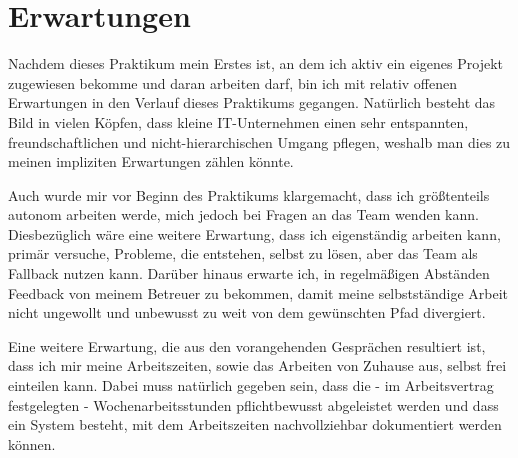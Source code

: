 
\section{Erwartungen}
\label{sec:erwartungen}

Nachdem dieses Praktikum mein Erstes ist, an dem ich aktiv ein eigenes Projekt zugewiesen bekomme und daran arbeiten darf, bin ich mit relativ offenen Erwartungen in den Verlauf dieses Praktikums gegangen. Natürlich besteht das Bild in vielen Köpfen, dass kleine IT-Unternehmen einen sehr entspannten, freundschaftlichen und nicht-hierarchischen Umgang pflegen, weshalb man dies zu meinen impliziten Erwartungen zählen könnte. 

Auch wurde mir vor Beginn des Praktikums klargemacht, dass ich größtenteils autonom arbeiten werde, mich jedoch bei Fragen an das Team wenden kann. Diesbezüglich wäre eine weitere Erwartung, dass ich eigenständig arbeiten kann, primär versuche, Probleme, die entstehen, selbst zu lösen, aber das Team als Fallback nutzen kann. Darüber hinaus erwarte ich, in regelmäßigen Abständen Feedback von meinem Betreuer zu bekommen, damit meine selbstständige Arbeit nicht ungewollt und unbewusst zu weit von dem gewünschten Pfad divergiert.

Eine weitere Erwartung, die aus den vorangehenden Gesprächen resultiert ist, dass ich mir meine Arbeitszeiten, sowie das Arbeiten von Zuhause aus, selbst frei einteilen kann. Dabei muss natürlich gegeben sein, dass die - im Arbeitsvertrag festgelegten - Wochenarbeitsstunden pflichtbewusst abgeleistet werden und dass ein System besteht, mit dem Arbeitszeiten nachvollziehbar dokumentiert werden können.